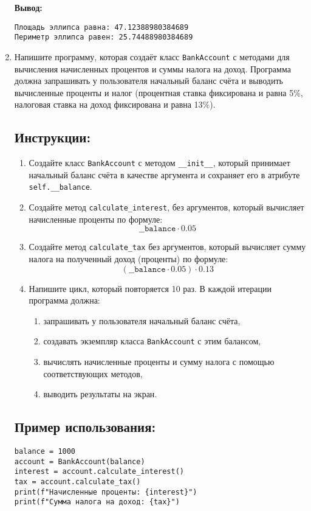 \begin{enumerate}
\textbf{Вывод:}
\begin{verbatim}
Площадь эллипса равна: 47.12388980384689
Периметр эллипса равен: 25.74488980384689
\end{verbatim}

\item
Напишите программу, которая создаёт класс \texttt{BankAccount} с методами для вычисления начисленных процентов
и суммы налога на доход. Программа должна запрашивать у пользователя начальный баланс счёта
и выводить вычисленные проценты и налог (процентная ставка фиксирована и равна 5\%, 
налоговая ставка на доход фиксирована и равна 13\%).

\subsection*{Инструкции:}
\begin{enumerate}
\item Создайте класс \texttt{BankAccount} с методом
\texttt{\_\_init\_\_}, который принимает начальный баланс счёта в
качестве аргумента и сохраняет его в атрибуте \texttt{self.\_\_balance}.

\item Создайте метод \texttt{calculate\_interest},
без аргументов, который вычисляет начисленные проценты по формуле:
\[
\texttt{\_\_balance} \cdot 0.05
\]

\item Создайте метод \texttt{calculate\_tax} без аргументов,
который вычисляет сумму налога на полученный доход (проценты) по формуле:
\[
(\texttt{\_\_balance} \cdot 0.05) \cdot 0.13
\]

\item Напишите цикл, который повторяется 10 раз. В каждой итерации программа должна:
\begin{enumerate}
\item запрашивать у пользователя начальный баланс счёта,
\item создавать экземпляр класса \texttt{BankAccount} с этим балансом,
\item вычислять начисленные проценты и сумму налога с помощью соответствующих методов,
\item выводить результаты на экран.
\end{enumerate}
\end{enumerate}

\subsection*{Пример использования:}
\begin{verbatim}
balance = 1000
account = BankAccount(balance)
interest = account.calculate_interest()
tax = account.calculate_tax()
print(f"Начисленные проценты: {interest}")
print(f"Сумма налога на доход: {tax}")
\end{verbatim}


\end{enumerate}
